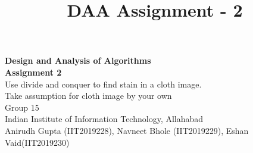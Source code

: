 \documentclass[10pt]{article}
\author{}
\title{\Large{DAA Assignment - 2}}
\begin{document}
	
	\begin{center}
		{\Large \textbf{Design and Analysis of Algorithms}}\\
		\vspace{1em}
		{\Large \textbf{Assignment 2}}\\
		\vspace{1em}
		{\large Use divide and conquer to find stain in a cloth image.\\Take assumption for
cloth image by your own
}\\
		\vspace{1em}
		{\large Group 15}\\
		\vspace{1em}
		\large{Indian Institute of Information Technology, Allahabad}\\
		\vspace{1em}
		\large{Anirudh Gupta (IIT2019228), Navneet Bhole (IIT2019229), Eshan Vaid(IIT2019230)}\\
		\vspace{2.5em}
		
	\end{center}
	
\end{document}
